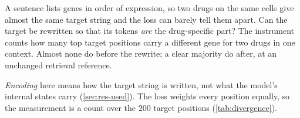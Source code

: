 

\begin{question}[5]
A sentence lists genes in order of expression, so two drugs on the same
cells give almost the same target string and the loss can barely tell them apart.
Can the target be rewritten so that its tokens \emph{are} the drug-specific part?
The instrument counts how many top target positions carry a different gene for
two drugs in one context. Almost none do before the rewrite; a clear majority do
after, at an unchanged retrieval reference.
\end{question}

\noindent
\emph{Encoding} here means how the target string is written, not what the model's
internal states carry (\cref{sec:res-used}). The loss weights every position
equally, so the measurement is a count over the $200$ target positions
(\cref{tab:divergence}).

